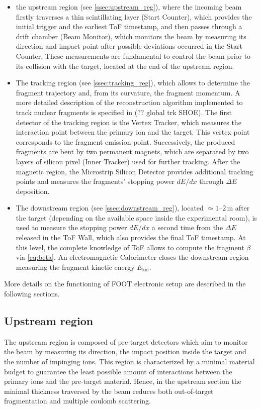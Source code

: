 \begin{itemize}
	\item the upstream region (see \autoref{ssec:upstream_reg}), where the incoming beam firstly traverses a thin scintillating layer (Start Counter), which provides the initial trigger and the earliest ToF timestamp, and then passes through a drift chamber (Beam Monitor), which monitors the beam by measuring its direction and impact point after possible deviations occurred in the Start Counter. These measurements are fundamental to control the beam prior to its collision with the target, located at the end of the upstream region.
	\item The tracking region (see \autoref{ssec:tracking_reg}), which allows to determine the fragment trajectory and, from its curvature, the fragment momentum. A more detailed description of the reconstruction algorithm implemented to track nuclear fragments is specified in (?? global trk SHOE). The first detector of the tracking region is the Vertex Tracker, which measures the interaction point between the primary ion and the target. This vertex point corresponds to the fragment emission point. Successively, the produced fragments are bent by two permanent magnets, which are separated by two layers of silicon pixel (Inner Tracker) used for further tracking. After the magnetic region, the Microstrip Silicon Detector provides additional tracking points and measures the fragments' stopping power $dE/dx$ through $\Delta E$ deposition.
	\item The downstream region (see \autoref{ssec:downstream_reg}), located $\simeq1$--$2\,\mathrm{m}$ after the target (depending on the available space inside the experimental room), is used to measure the stopping power $dE/dx$ a second time from the $\Delta E$ released in the ToF Wall, which also provides the final ToF timestamp. At this level, the complete knowledge of ToF allows to compute the fragment $\beta$ via \autoref{eq:beta}. An electromagnetic Calorimeter closes the downstream region measuring the fragment kinetic energy $E_\text{kin}$.
\end{itemize}
More details on the functioning of FOOT electronic setup are described in the following sections.
\subsection{Upstream region}\label{ssec:upstream_reg}
The upstream region is composed of pre-target detectors which aim to monitor the beam by measuring its direction, the impact position inside the target and the number of impinging ions. This region is characterized by a minimal material budget to guarantee the least possible amount of interactions between the primary ions and the pre-target material. Hence, in the upstream section the minimal thickness traversed by the beam reduces both out-of-target fragmentation and multiple coulomb scattering.

